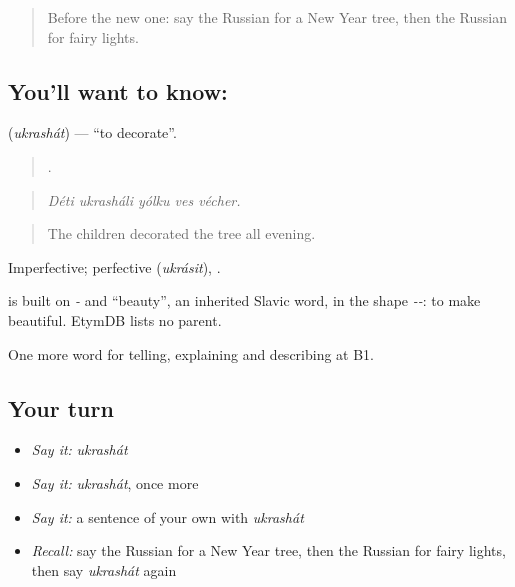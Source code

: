 \label{lesson:RU-C313-ukrashat}



\begin{quote}
Before the new one: say the Russian for a New Year tree, then the Russian for fairy lights.
\end{quote}

\subsection*{You'll want to know: }
\textbf{} (\emph{ukrashát}) — \textquotedblleft{}to decorate\textquotedblright{}.

\begin{quote}
    .
\end{quote}

\begin{quote}
\emph{Déti ukrasháli yólku ves vécher.}
\end{quote}

\begin{quote}
The children decorated the tree all evening.
\end{quote}

Imperfective; perfective \emph{} (\emph{ukrásit}), \emph{}.

\begin{cousinweb}
\emph{} is built on \emph{-} and \emph{} \textquotedblleft{}beauty\textquotedblright{}, an inherited Slavic word, in the shape \emph{--}: to make beautiful. EtymDB lists no parent.
\end{cousinweb}

\begin{grammarlens}[title={What you've built}]
One more word for telling, explaining and describing at B1.
\end{grammarlens}

\subsection*{Your turn}
\begin{itemize}
\raggedright
  \item \emph{Say it:} \emph{ukrashát}
  \item \emph{Say it:} \emph{ukrashát}, once more
  \item \emph{Say it:} a sentence of your own with \emph{ukrashát}
  \item \emph{Recall:} say the Russian for a New Year tree, then the Russian for fairy lights, then say \emph{ukrashát} again
\end{itemize}

